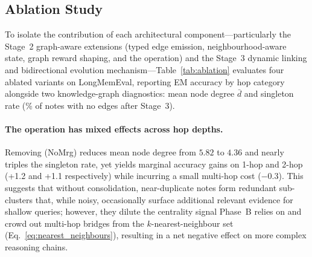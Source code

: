 \subsection{Ablation Study}
\label{subsec:ablation}

To isolate the contribution of each architectural component---particularly
the Stage~2 graph-aware extensions (typed edge emission, neighbourhood-aware
state, graph reward shaping, and the \merge{} operation) and the Stage~3
dynamic linking and bidirectional evolution mechanism---Table~\ref{tab:ablation}
evaluates four ablated \ours variants on LongMemEval, reporting EM accuracy
by hop category alongside two knowledge-graph diagnostics: mean node degree
$\bar{d}$ and singleton rate (\% of notes with no edges after Stage~3).

\begin{table}[t]
\centering
\caption{Ablation study on LongMemEval (EM \%, mean over five seeds), plus
knowledge-graph diagnostics ($\bar{d}$: mean node degree; \textbf{Sgl.}:
singleton \%). $\Delta$ values vs.\ full \ours in parentheses. Variants:
\textbf{NoMrg} = no \merge{} operation (Stage~2); \textbf{NoGR} = no
graph-aware reward $R_{\mathrm{graph}}$ (Stage~2); \textbf{NoLnk} = no
linking, Stage~3 disabled; \textbf{NoBE} = no bidirectional evolution
(Stage~3, forward links only); \textbf{AL} = Atomic-Linking baseline (no
RL write ops, no utility retrieval).}
\label{tab:ablation}
\end{table}

\paragraph{The \merge{} operation has mixed effects across hop depths.}
Removing \merge{} (NoMrg) reduces mean node degree from $5.82$ to $4.36$ and
nearly triples the singleton rate, yet yields marginal accuracy gains on
1-hop and 2-hop (+1.2 and +1.1 respectively) while incurring a small
multi-hop cost ($-0.3$).
This suggests that without consolidation, near-duplicate notes form redundant
sub-clusters that, while noisy, occasionally surface additional relevant
evidence for shallow queries; however, they dilute the centrality signal
Phase~B relies on and crowd out multi-hop bridges from the
$k$-nearest-neighbour set (Eq.~\eqref{eq:nearest_neighbours}), resulting in
a net negative effect on more complex reasoning chains.

